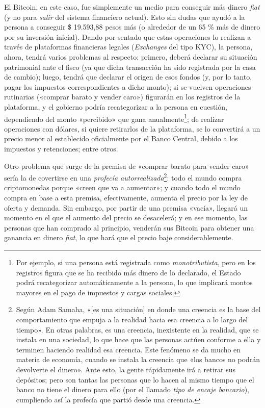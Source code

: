 \documentclass[12pt,a4paper,twoside]{book}
\begin{document}
El Bitcoin, en este caso, fue simplemente un medio para conseguir más dinero \textit{fiat} (y no para \textit{salir} del sistema financiero actual). Esto sin dudas que ayudó a la persona a conseguir \$ 19.593,88 pesos más (o alrededor de un 65 \% más de dinero por su inversión inicial). Dando por sentado que estas operaciones lo realizan a través de plataformas financieras legales (\textit{Exchanges} del tipo KYC), la persona, ahora, tendrá varios problemas al respecto: primero, deberá declarar su situación patrimonial ante el fisco (ya que dicha transacción ha sido registrada por la casa de cambio); luego, tendrá que declarar el origen de esos fondos (y, por lo tanto, pagar los impuestos correspondientes a dicho monto); si se vuelven operaciones rutinarias («comprar barato y vender caro») figurarán en los registros de la plataforma, y el gobierno podría recategorizar a la persona en cuestión, dependiendo del monto «percibido» que gana anualmente\footnote{Por ejemplo, si una persona está registrada como \textit{monotributista}, pero en los registros figura que se ha recibido más dinero de lo declarado, el Estado podrá recategorizar automáticamente a la persona, lo que implicará montos mayores en el pago de impuestos y cargas sociales.}; de realizar operaciones con dólares, si quiere retirarlos de la plataforma, se lo convertirá a un precio menor al establecido oficialmente por el Banco Central, debido a los impuestos y retenciones; entre otros.

Otro problema que surge de la premisa de «comprar barato para vender caro» sería la de covertirse en una \textit{profecía autorrealizada}\footnote{Según Adam Samaha, «[es una situación] en donde una creencia es la base del comportamiento que empuja a la realidad hacia esa creencia a lo largo del tiempo». \cite[pág. 11]{profeautorea} En otras palabras, es una creencia, inexistente en la realidad, que se instala en una sociedad, lo que hace que las personas actúen conforme a ella y terminen haciendo realidad esa creencia. Este fenómeno se da mucho en materia de economía, cuando se instala la creencia que «los bancos no podrán devolverte el dinero». Ante esto, la gente rápidamente irá a retirar sus depósitos; pero son tantas las personas que lo hacen al mismo tiempo que el banco no tiene el dinero para ello (por el llamado \textit{tipo de encaje bancario}), cumpliendo así la profecía que partió desde una creencia.}: todo el mundo compra criptomonedas porque «creen que va a aumentar»; y cuando todo el mundo compra en base a esta premisa, efectivamente, aumenta el precio por la ley de oferta y demanda. Sin embargo, por partir de una premisa «vacía», llegará un momento en el que el aumento del precio se desacelerá; y en ese momento, las personas que han comprado al principio, venderán sus Bitcoin para obtener una ganancia en dinero \textit{fiat}, lo que hará que el precio baje considerablemente.
\end{document}
